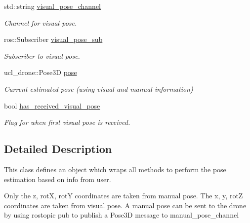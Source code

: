 \begin{DoxyCompactItemize}
\mbox{\label{classManualPoseEstimator_a234948acc3fb2e252c1b522c5adc0cfb}} 
std\+::string \hyperlink{classManualPoseEstimator_a234948acc3fb2e252c1b522c5adc0cfb}{visual\+\_\+pose\+\_\+channel}
\begin{DoxyCompactList}\small\item\em Channel for visual pose. \end{DoxyCompactList}\item 
\mbox{\label{classManualPoseEstimator_a283880b513982528236ae380d38b878d}} 
ros\+::\+Subscriber \hyperlink{classManualPoseEstimator_a283880b513982528236ae380d38b878d}{visual\+\_\+pose\+\_\+sub}
\begin{DoxyCompactList}\small\item\em Subscriber to visual pose. \end{DoxyCompactList}\item 
\mbox{\label{classManualPoseEstimator_a137fb097b5b9822146afe0409f1c7464}} 
ucl\+\_\+drone\+::\+Pose3D \hyperlink{classManualPoseEstimator_a137fb097b5b9822146afe0409f1c7464}{pose}
\begin{DoxyCompactList}\small\item\em Current estimated pose (using visual and manual information) \end{DoxyCompactList}\item 
\mbox{\label{classManualPoseEstimator_a0d0b3e32a5d47bee9e849398a44aec8a}} 
bool \hyperlink{classManualPoseEstimator_a0d0b3e32a5d47bee9e849398a44aec8a}{has\+\_\+received\+\_\+visual\+\_\+pose}
\begin{DoxyCompactList}\small\item\em Flag for when first visual pose is received. \end{DoxyCompactList}\end{DoxyCompactItemize}


\subsection{Detailed Description}
This class defines an object which wraps all methods to perform the pose estimation based on info from user. 

Only the z, rotX, rotY coordinates are taken from manual pose. The x, y, rotZ coordinates are taken from visual pose. A manual pose can be sent to the drone by using rostopic pub to publish a Pose3D message to manual\+\_\+pose\+\_\+channel 

